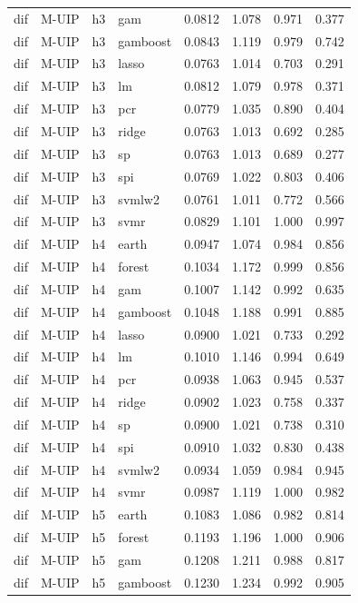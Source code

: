\begin{ThreePartTable}
\begin{longtable}[t]{llclcccc}
dif & M-UIP & h3 & gam & 0.0812 & 1.078 & 0.971 & 0.377\\
dif & M-UIP & h3 & gamboost & 0.0843 & 1.119 & 0.979 & 0.742\\
dif & M-UIP & h3 & lasso & 0.0763 & 1.014 & 0.703 & 0.291\\
dif & M-UIP & h3 & lm & 0.0812 & 1.079 & 0.978 & 0.371\\
dif & M-UIP & h3 & pcr & 0.0779 & 1.035 & 0.890 & 0.404\\
dif & M-UIP & h3 & ridge & 0.0763 & 1.013 & 0.692 & 0.285\\
dif & M-UIP & h3 & sp & 0.0763 & 1.013 & 0.689 & 0.277\\
dif & M-UIP & h3 & spi & 0.0769 & 1.022 & 0.803 & 0.406\\
dif & M-UIP & h3 & svmlw2 & 0.0761 & 1.011 & 0.772 & 0.566\\
dif & M-UIP & h3 & svmr & 0.0829 & 1.101 & 1.000 & 0.997\\
\addlinespace
dif & M-UIP & h4 & earth & 0.0947 & 1.074 & 0.984 & 0.856\\
dif & M-UIP & h4 & forest & 0.1034 & 1.172 & 0.999 & 0.856\\
dif & M-UIP & h4 & gam & 0.1007 & 1.142 & 0.992 & 0.635\\
dif & M-UIP & h4 & gamboost & 0.1048 & 1.188 & 0.991 & 0.885\\
dif & M-UIP & h4 & lasso & 0.0900 & 1.021 & 0.733 & 0.292\\
dif & M-UIP & h4 & lm & 0.1010 & 1.146 & 0.994 & 0.649\\
dif & M-UIP & h4 & pcr & 0.0938 & 1.063 & 0.945 & 0.537\\
dif & M-UIP & h4 & ridge & 0.0902 & 1.023 & 0.758 & 0.337\\
dif & M-UIP & h4 & sp & 0.0900 & 1.021 & 0.738 & 0.310\\
dif & M-UIP & h4 & spi & 0.0910 & 1.032 & 0.830 & 0.438\\
dif & M-UIP & h4 & svmlw2 & 0.0934 & 1.059 & 0.984 & 0.945\\
dif & M-UIP & h4 & svmr & 0.0987 & 1.119 & 1.000 & 0.982\\
\addlinespace
dif & M-UIP & h5 & earth & 0.1083 & 1.086 & 0.982 & 0.814\\
dif & M-UIP & h5 & forest & 0.1193 & 1.196 & 1.000 & 0.906\\
dif & M-UIP & h5 & gam & 0.1208 & 1.211 & 0.988 & 0.817\\
dif & M-UIP & h5 & gamboost & 0.1230 & 1.234 & 0.992 & 0.905\\

\end{longtable}
\end{ThreePartTable}
